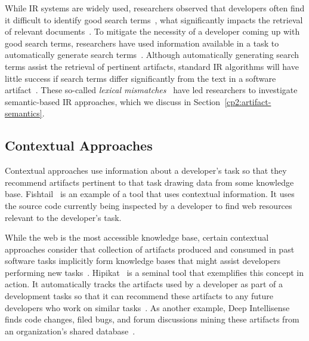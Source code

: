 While IR systems are widely used, researchers 
observed that developers often find it difficult to identify good search terms~\cite{Kevic2014, Huang2018},
what significantly impacts the retrieval of relevant documents~\cite{Kevic2014, mills2017}.
To mitigate  the necessity of a developer coming up with good search terms,
researchers have used information available in a task to automatically generate search terms~\cite{Kevic2014, Haiduc2013}. 
Although automatically generating search terms assist the retrieval of pertinent artifacts,
standard \acs{IR} algorithms will have 
little success if search terms 
differ significantly from the text in a software artifact~\cite{Huang2018}.
These so-called \textit{lexical mismatches}~\cite{Ye2016, silva2019} have led researchers to investigate 
 semantic-based \acs{IR} approaches, which we discuss in 
Section~\ref{cp2:artifact-semantics}.




% 


\subsection{Contextual Approaches} 


Contextual approaches use information 
about a developer's task so that 
they recommend artifacts pertinent to that task drawing data from some knowledge base.
Fishtail~\cite{Sawadsky2011}
is an example of a tool that uses contextual information. It uses the source code currently being inspected by a developer to find web resources relevant to the developer's task.



While the web is the most accessible knowledge base, certain contextual approaches consider that 
collection of artifacts produced and consumed in past software tasks 
 implicitly
form knowledge bases that might assist developers performing new tasks~\cite{Cubranic2005}. 
Hipikat~\cite{Cubranic2005} is a seminal tool that exemplifies this concept in action.
It automatically tracks the artifacts 
used by a developer as part of a development tasks
so that it can recommend these artifacts to 
any future developers who work on similar tasks~\cite{Cubranic2005}.
As another example, Deep Intellisense
finds code changes, filed bugs, and forum discussions 
mining these artifacts from an organization's shared database~\cite{Holmes2008}.










